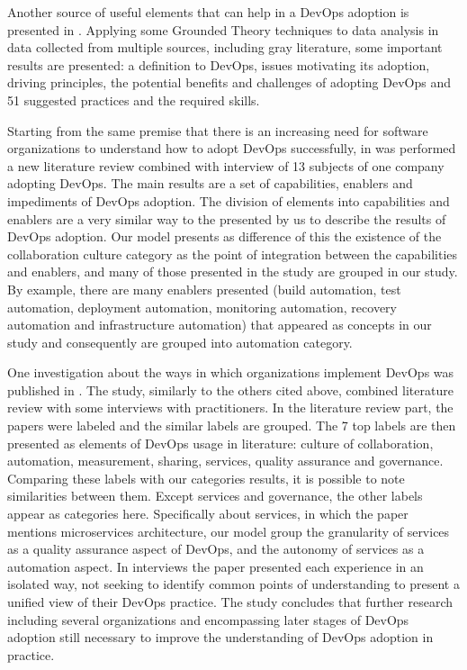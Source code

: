 Another source of useful elements that can help in a DevOps adoption is
presented in \cite{characterizing_devops_sbes_2016}. Applying some Grounded
Theory techniques to data analysis in data collected from multiple sources,
including gray literature, some important results are presented: a definition
to DevOps, issues motivating its adoption, driving principles, the potential
benefits and challenges of adopting DevOps and 51 suggested practices and the
required skills.


Starting from the same premise that there is an increasing need for software
organizations to understand how to adopt DevOps successfully, in
\cite{devops_a_definition_xp_15} was performed a new literature review combined
with interview of 13 subjects of one company adopting DevOps. The main results
are a set of capabilities, enablers and impediments of DevOps adoption. The
division of elements into capabilities and enablers are a very similar way to
the presented by us to describe the results of DevOps adoption. Our model
presents as difference of this the existence of the collaboration culture
category as the point of integration between the capabilities and enablers, and
many of those presented in the study are grouped in our study. By example,
there are many enablers presented (build automation, test automation,
deployment automation, monitoring automation, recovery automation and
infrastructure automation) that appeared as concepts in our study and
consequently are grouped into automation category.

One investigation about the ways in which organizations implement DevOps was
published in \cite{qualitative_devops_journalsw_17}. The study, similarly
to the others cited above, combined literature review with some interviews with
practitioners. In the literature review part, the papers were labeled and the
similar labels are grouped. The 7 top labels are then presented as elements of
DevOps usage in literature: culture of collaboration, automation, measurement,
sharing, services, quality assurance and governance. Comparing these labels
with our categories results, it is possible to note similarities between them.
Except services and governance, the other labels appear as categories here.
Specifically about services, in which the paper mentions microservices
architecture, our model group the granularity of services as a quality
assurance aspect of DevOps, and the autonomy of services as a automation aspect.
In interviews the paper presented each experience in an isolated way, not
seeking to identify common points of understanding to present a unified view
of their DevOps practice. The study concludes that further research including
several organizations and encompassing later stages of DevOps adoption still
necessary to improve the understanding of DevOps adoption in practice.

